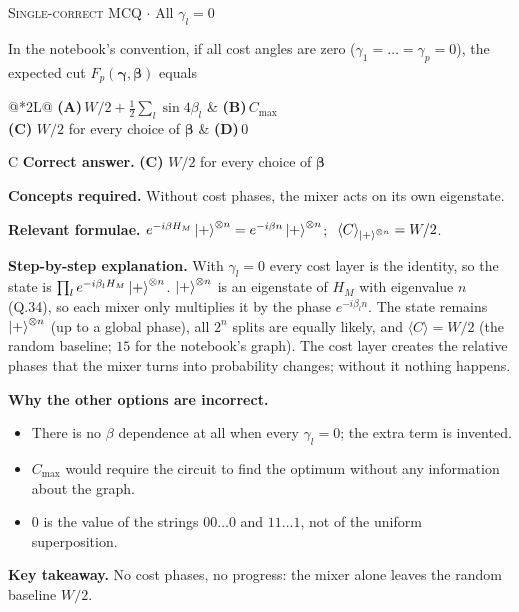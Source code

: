 \documentclass[11pt,a4paper]{article}
\newcommand{\optlabel}[1]{\textbf{(#1)}}
\newcommand{\correctlabel}[1]{\textcolor{okgreen}{\textbf{(#1)}\,\ding{51}}}
\newenvironment{qitem}[1]{\begin{list}{}{\setlength{\leftmargin}{3.3em}\setlength{\labelwidth}{3.1em}%
  \setlength{\labelsep}{0.2em}\setlength{\topsep}{3pt}\setlength{\parsep}{3pt}}\item[\textbf{Q.#1}\hfill]}{\end{list}}
\newcommand{\qsep}{\par\vspace{2pt}{\color{black!15}\hrule}\vspace{4pt}}
\newcommand{\qmeta}[2]{{\footnotesize\color{black!60}\textsc{#1} \;$\cdot$\; #2}\par}
\begin{document}
\begin{qitem}{42}
\qmeta{Single-correct MCQ}{All $\gamma_l = 0$}
In the notebook's convention, if all cost angles are zero ($\gamma_1 = \dots = \gamma_p = 0$), the expected cut
$F_p(\boldsymbol\gamma, \boldsymbol\beta)$ equals
\par\smallskip\noindent\begin{tabularx}{\linewidth}{@{}*{2}{L}@{}}
\optlabel{A}\,$W/2 + \tfrac12\sum_l \sin 4\beta_l$ & \optlabel{B}\,$C_{\max}$ \\[3pt]
\correctlabel{C}\,$W/2$ for every choice of $\boldsymbol\beta$ & \optlabel{D}\,$0$
\end{tabularx}
\end{qitem}
\begin{solbox}{C}
\textbf{\color{brand}Correct answer.} \textcolor{okgreen}{\textbf{(C)}} $W/2$ for every choice of $\boldsymbol\beta$

\textbf{\color{brand}Concepts required.} Without cost phases, the mixer acts on its own eigenstate.

\textbf{\color{brand}Relevant formulae.} $e^{-i\beta H_M}\ket+^{\otimes n} = e^{-i\beta n}\ket+^{\otimes n}$; $\ \langle C\rangle_{\ket+^{\otimes n}} = W/2$.

\textbf{\color{brand}Step-by-step explanation.} With $\gamma_l = 0$ every cost layer is the identity, so the state is $\prod_l e^{-i\beta_l H_M}\ket+^{\otimes n}$.
$\ket+^{\otimes n}$ is an eigenstate of $H_M$ with eigenvalue $n$ (Q.34), so each mixer only multiplies it by the phase $e^{-i\beta_l n}$.
The state remains $\ket+^{\otimes n}$ (up to a global phase), all $2^n$ splits are equally likely, and $\langle C\rangle = W/2$
(the random baseline; $15$ for the notebook's graph). The cost layer creates the relative phases that the mixer turns into
probability changes; without it nothing happens.

\textbf{\color{brand}Why the other options are incorrect.}
\begin{itemize}[leftmargin=2.4em, itemsep=1pt, topsep=2pt]
\item[\textbf{(A)}] There is no $\beta$ dependence at all when every $\gamma_l = 0$; the extra term is invented.
\item[\textbf{(B)}] $C_{\max}$ would require the circuit to find the optimum without any information about the graph.
\item[\textbf{(D)}] $0$ is the value of the strings $00\dots0$ and $11\dots1$, not of the uniform superposition.
\end{itemize}
\textbf{\color{brand}Key takeaway.} No cost phases, no progress: the mixer alone leaves the random baseline $W/2$.
\end{solbox}
\qsep
\end{document}
